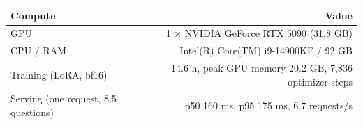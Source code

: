 \begin{tabular}{lr}
\toprule
Compute & Value \\
\midrule
GPU & 1 × NVIDIA GeForce RTX 5090 (31.8 GB) \\
CPU / RAM & Intel(R) Core(TM) i9-14900KF / 92 GB \\
Training (LoRA, bf16) & 14.6 h, peak GPU memory 20.2 GB, 7,836 optimizer steps \\
Serving (one request, 8.5 questions) & p50 160 ms, p95 175 ms, 6.7 requests/s \\
\bottomrule
\end{tabular}
